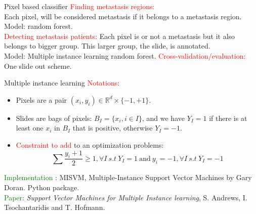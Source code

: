 \documentclass{beamer}
\begin{document}
\begin{frame}{Pixel based classifier}
\textcolor{red}{Finding metastasis regions:}\\
Each pixel, will be considered metastasis if it belongs to a metastasis region. \\
Model: random forest. \\
\textcolor{red}{Detecting metastasis patients:}
Each pixel is or not a metastasis but it also belongs to bigger group. This larger group, the slide, is annotated. \\
Model: Multiple instance learning random forest.
\textcolor{red}{Cross-validation/evaluation:} \\
One slide out scheme.
\end{frame}

\begin{frame}{Multiple instance learning}
\textcolor{red}{Notations}:
\begin{itemize}
\item Pixels are a pair $(x_i,y_i) \in \mathbb{R}^d \times \lbrace -1, +1\rbrace$.
\item Slides are bags of pixels: $B_I=\lbrace x_i, i\in I \rbrace$, and we have $Y_I=1$ if there is at least one $x_i$ in $B_I$ that is positive, otherwise $Y_I=-1$. 
\item \textcolor{red}{Constraint to add} to an optimization problems: \\
$$\sum \frac{y_i+1}{2} \geqslant 1, \forall I \ s.t \ Y_I=1 \ \text{and} \ y_i=-1, \forall I \ s.t \ Y_I=-1$$
\end{itemize}
\textcolor{green}{Implementation} : MISVM, Multiple-Instance Support Vector Machines by Gary Doran. Python package. \\
\textcolor{green}{Paper}: \textit{Support Vector Machines for Multiple Instance learning}, S. Andrews, I. Tsochantaridis and T. Hofmann.
\end{frame}
\end{document}
